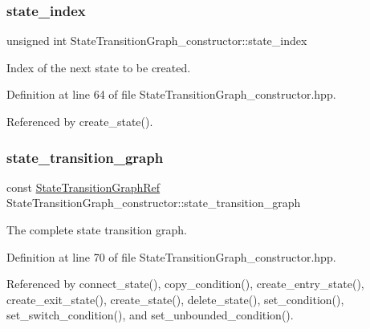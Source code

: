 \subsubsection{\texorpdfstring{state\+\_\+index}{state\_index}}
{\footnotesize\ttfamily unsigned int State\+Transition\+Graph\+\_\+constructor\+::state\+\_\+index\hspace{0.3cm}{\ttfamily [private]}}



Index of the next state to be created. 



Definition at line 64 of file State\+Transition\+Graph\+\_\+constructor.\+hpp.



Referenced by create\+\_\+state().

\mbox{\label{classStateTransitionGraph__constructor_ace30bb027ffcf699d0cb7b540347327d}} 
\subsubsection{\texorpdfstring{state\+\_\+transition\+\_\+graph}{state\_transition\_graph}}
{\footnotesize\ttfamily const \hyperlink{state__transition__graph_8hpp_a50ba60cd5e113de254d5d7638bbbba86}{State\+Transition\+Graph\+Ref} State\+Transition\+Graph\+\_\+constructor\+::state\+\_\+transition\+\_\+graph\hspace{0.3cm}{\ttfamily [private]}}



The complete state transition graph. 



Definition at line 70 of file State\+Transition\+Graph\+\_\+constructor.\+hpp.



Referenced by connect\+\_\+state(), copy\+\_\+condition(), create\+\_\+entry\+\_\+state(), create\+\_\+exit\+\_\+state(), create\+\_\+state(), delete\+\_\+state(), set\+\_\+condition(), set\+\_\+switch\+\_\+condition(), and set\+\_\+unbounded\+\_\+condition().

\mbox{\label{classStateTransitionGraph__constructor_afe8681a397d20043b1c0910c29e9bdc9}} 
